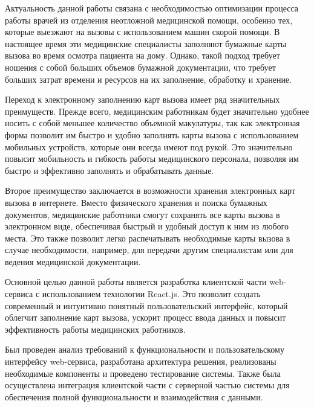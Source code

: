 \introduction %

Актуальность данной работы связана с необходимостью оптимизации процесса работы врачей из отделения неотложной медицинской помощи, особенно тех, которые выезжают на вызовы с использованием машин скорой помощи. В настоящее время эти медицинские специалисты заполняют бумажные карты вызова во время осмотра пациента на дому. Однако, такой подход требует ношения с собой больших объемов бумажной документации, что требует больших затрат времени и ресурсов на их заполнение, обработку и хранение.

Переход к электронному заполнению карт вызова имеет ряд значительных преимуществ. Прежде всего, медицинским работникам будет значительно удобнее носить с собой меньшее количество объемной макулатуры, так как электронная форма позволит им быстро и удобно заполнять карты вызова с использованием мобильных устройств, которые они всегда имеют под рукой. Это значительно повысит мобильность и гибкость работы медицинского персонала, позволяя им быстро и эффективно заполнять и обрабатывать данные.

Второе преимущество заключается в возможности хранения электронных карт вызова в интернете. Вместо физического хранения и поиска бумажных документов, медицинские работники смогут сохранять все карты вызова в электронном виде, обеспечивая быстрый и удобный доступ к ним из любого места. Это также позволит легко распечатывать необходимые карты вызова в случае необходимости, например, для передачи другим специалистам или для ведения медицинской документации.

Основной целью данной работы является разработка клиентской части web-сервиса с использованием технологии React.js. Это позволит создать современный и интуитивно понятный пользовательский интерфейс, который облегчит заполнение карт вызова, ускорит процесс ввода данных и повысит эффективность работы медицинских работников.

Был проведен анализ требований к функциональности и пользовательскому интерфейсу web-сервиса, разработана архитектура решения, реализованы необходимые компоненты и проведено тестирование системы. Также была осуществлена интеграция клиентской части с серверной частью системы для обеспечения полной функциональности и взаимодействия с данными.

